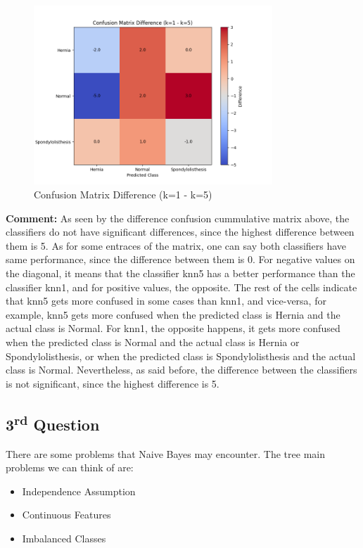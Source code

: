 \documentclass{article}
\begin{document}
\begin{figure}[H]
  \centering
  \includegraphics[width=0.8\textwidth]{images/confusion_matrix_difference.png}
  \caption{Confusion Matrix Difference (k=1 - k=5)}
  \label{fig:confusion_matrix_difference}
\end{figure}

\textbf{Comment:}
As seen by the difference confusion cummulative matrix above, the classifiers do not have significant differences, since the highest difference between them is 5. As for some entraces of the matrix, one can say both classifiers have same performance, since the difference between them is 0. For negative values on the diagonal, it means that the classifier knn5 has a better performance than the classifier knn1, and for positive values, the opposite. The rest of the cells indicate that knn5 gets more confused in some cases than knn1, and vice-versa, for example, knn5 gets more confused when the predicted class is Hernia and the actual class is Normal. For knn1, the opposite happens, it gets more confused when the predicted class is Normal and the actual class is Hernia or Spondylolisthesis, or when the predicted class is Spondylolisthesis and the actual class is Normal. 
Nevertheless, as said before, the difference between the classifiers is not significant, since the highest difference is 5.





\subsection*{3\textsuperscript{rd} Question}

There are some problems that Naive Bayes may encounter. The tree main problems we can think of are:
\begin{itemize}
  \item Independence Assumption
  \item Continuous Features
  \item Imbalanced Classes
\end{itemize}
\end{document}
